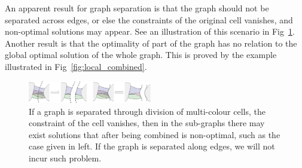 \documentclass[journal]{IEEEtran}
\begin{document}
An apparent result for graph separation is that the graph should not be separated across edges, or else the constraints of the original cell vanishes, and non-optimal solutions may appear. 
See an illustration of this scenario in Fig~\ref{fig:separation_at_edges}. 
Another result is that the optimality of part of the graph has no relation to the global optimal solution of the whole graph. 
This is proved by the example illustrated in Fig~\ref{fig:local_combined}. 

\begin{figure}[t]
\centering
\includegraphics[width=0.48\textwidth]{figures/separation_at_edges_2}
\caption{If a graph is separated through division of multi-colour cells, the constraint of the cell vanishes, then in the sub-graphs there may exist solutions that after being combined is non-optimal, such as the case given in left. If the graph is separated along edges, we will not incur such problem. }\label{fig:separation_at_edges}
\end{figure}



\end{document}
